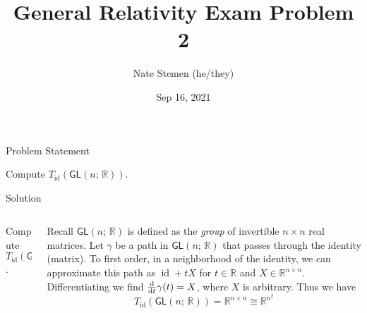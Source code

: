 \documentclass[11pt,aspectratio=1610]{beamer}
\title{General Relativity Exam Problem 2}
\date{Sep 16, 2021}
\author{Nate Stemen (he/they)}
\institute{AMATH 875}
\newcommand{\GL}[2]{\mathsf{GL}(#1;\, #2)}
\newcommand{\R}{\mathbb{R}}
\newcommand{\1}{\mathbb{1}}
\DeclareMathOperator{\id}{id}
\begin{document}
\maketitle

\begin{frame}{Problem Statement}
	\large
	\begin{prob}
		Compute $T_{\id}(\GL{n}{\R})$.
	\end{prob}
\end{frame}

\begin{frame}{Solution}
	\begin{columns}
		\begin{column}{0.25\textwidth}
			\begingroup
			\tiny
			\begin{prob}
				Compute $T_{\id}(\GL{n}{\R})$.
			\end{prob}
			\endgroup
		\end{column}
		\begin{column}{0.75\textwidth}
			\begin{solution}
				Recall $\GL{n}{\R}$ is defined as the \emph{group} of invertible $n\times n$ real matrices.
				Let $\gamma$ be a path in $\GL{n}{\R}$ that passes through the identity (matrix).
				To first order, in a neighborhood of the identity, we can approximate this path as $\id + t X$ for $t\in \R$ and $X\in\R^{n\times n}$.
				Differentiating we find $\dv{t}\gamma(t) = X$, where $X$ is arbitrary. Thus we have
				\begin{equation*}
					T_{\id}(\GL{n}{\R}) = \R^{n \times n} \cong \R^{n^2}
				\end{equation*}
			\end{solution}
		\end{column}
	\end{columns}
\end{frame}
\end{document}
